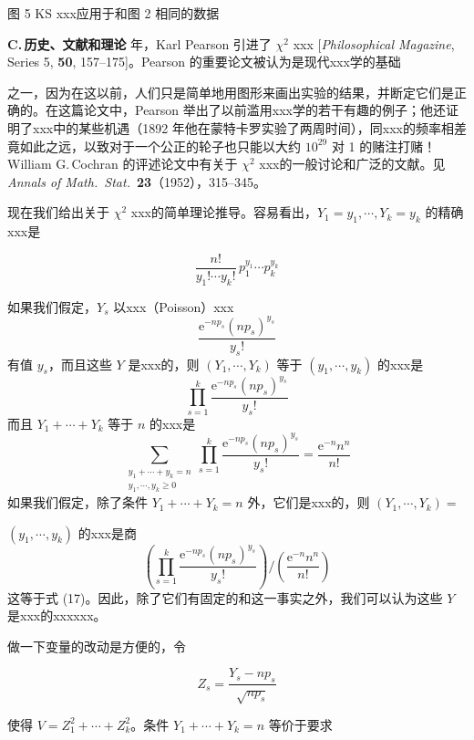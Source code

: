 \begin{center}
图 5 \quad KS xxx应用于和图 2 相同的数据
\end{center}

\textbf{C.\,历史、文献和理论}  年，Karl Pearson 引进了 $\chi^2$ xxx [\textit{Philosophical Magazine}, Series 5, \textbf{50}, 157--175]。Pearson 的重要论文被认为是现代xxx学的基础

\noindent 之一，因为在这以前，人们只是简单地用图形来画出实验的结果，并断定它们是正确的。在这篇论文中，Pearson 举出了以前滥用xxx学的若干有趣的例子；他还证明了xxx中的某些机遇（1892 年他在蒙特卡罗实验了两周时间），同xxx的频率相差竟如此之远，以致对于一个公正的轮子也只能以大约 $10^{29}$ 对 1 的赌注打赌！William G.\,Cochran 的评述论文中有关于 $\chi^2$ xxx的一般讨论和广泛的文献。见 \textit{Annals of Math.\ Stat.}\ \textbf{23}（1952），315--345。

现在我们给出关于 $\chi^2$ xxx的简单理论推导。容易看出，$Y_1 = y_1, \cdots, Y_k = y_k$ 的精确xxx是

\begin{equation}
\frac{n!}{y_1!\cdots y_k!}\,p_1^{y_1}\cdots p_k^{y_k} \tag{17}
\end{equation}

如果我们假定，$Y_s$ 以xxx（Poisson）xxx
\[
\frac{\mathrm{e}^{-np_s}(np_s)^{y_s}}{y_s!}
\]
有值 $y_s$，而且这些 $Y$ 是xxx的，则 $(Y_1, \cdots, Y_k)$ 等于 $(y_1, \cdots, y_k)$ 的xxx是
\[
\prod_{s=1}^{k} \frac{\mathrm{e}^{-np_s}(np_s)^{y_s}}{y_s!}
\]
而且 $Y_1 + \cdots + Y_k$ 等于 $n$ 的xxx是
\[
\sum_{\substack{y_1 + \cdots + y_k = n \\ y_1, \cdots, y_k \geqslant 0}} \prod_{s=1}^{k} \frac{\mathrm{e}^{-np_s}(np_s)^{y_s}}{y_s!} = \frac{\mathrm{e}^{-n} n^n}{n!}
\]
如果我们假定，除了条件 $Y_1 + \cdots + Y_k = n$ 外，它们是xxx的，则 $(Y_1, \cdots, Y_k) =$

\noindent $(y_1, \cdots, y_k)$ 的xxx是商
\[
\left( \prod_{s=1}^{k} \frac{\mathrm{e}^{-np_s}(np_s)^{y_s}}{y_s!} \right) \bigg/ \left( \frac{\mathrm{e}^{-n} n^n}{n!} \right)
\]
这等于式 (17)。因此，除了它们有固定的和这一事实之外，我们可以认为这些 $Y$ 是xxx的xxxxxx。

做一下变量的改动是方便的，令

\begin{equation}
Z_s = \frac{Y_s - np_s}{\sqrt{np_s}} \tag{18}
\end{equation}

\noindent 使得 $V = Z_1^2 + \cdots + Z_k^2$。条件 $Y_1 + \cdots + Y_k = n$ 等价于要求

